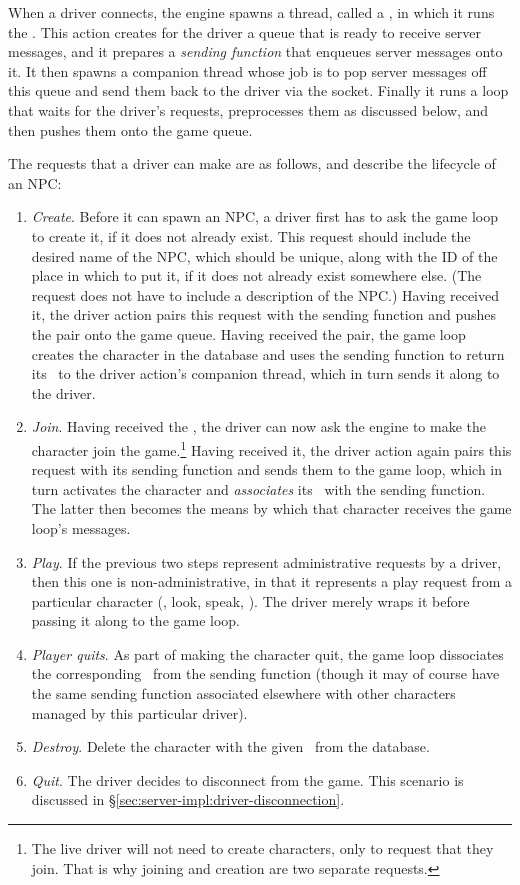 When a driver connects, the engine spawns a thread, called a
, in which it runs the .
This action creates for the driver a queue that is ready to receive
server messages, and it prepares a {\em sending function} that enqueues server
messages onto it.
It then spawns a companion thread whose job is to pop server messages off this
queue and send them back to the driver via the socket.
Finally it runs a loop that waits for the driver's requests, preprocesses
them as discussed below, and then pushes them onto the game queue.

The requests that a driver can make are as follows, and describe the lifecycle
of an NPC:
\begin{enumerate}
    \item {\em Create}.
    Before it can spawn an NPC, a driver first has to ask the game loop to
    create it, if it does not already exist.
    This request should include the desired name of the NPC, which should be
    unique, along with the ID of the place in which to put it, if it does not
    already exist somewhere else.
    (The request does not have to include a description of the NPC\@.)
    Having received it, the driver action pairs this request with the
    sending function and pushes the pair onto the game queue.
    Having received the pair, the game loop creates the character in the
    database and uses the sending function to return its \cid\ to the driver
    action's companion thread, which in turn sends it along to the driver.
    \item {\em Join}.
    Having received the \cid, the driver can now ask the
    engine to make the character join the game.\footnote{The live driver will
    not need to create characters, only to request that they join.
    That is why joining and creation are two separate requests.}
    Having received it, the driver action again pairs this request with its
    sending function and sends them to the game loop, which in turn activates
    the character and {\em associates} its \cid\ with the sending function.
    The latter then becomes the means by which that character receives the game
    loop's messages.
    \item {\em Play}.
    If the previous two steps represent administrative requests by a driver,
    then this one is non-administrative, in that it represents a play request
    from a particular character (\eg, look, speak, \etc).
    The driver merely wraps it before passing it along to the game loop.
    \item {\em Player quits}.
    As part of making the character quit, the game loop dissociates the
    corresponding \cid\ from the sending function (though
    it may of course have the same sending function associated elsewhere with
    other characters managed by this particular driver).
    \item {\em Destroy}.
    Delete the character with the given \cid\ from the database.
    \item {\em Quit}.
    The driver decides to disconnect from the game.
    This scenario is discussed in \S\ref{sec:server-impl:driver-disconnection}.
\end{enumerate}
